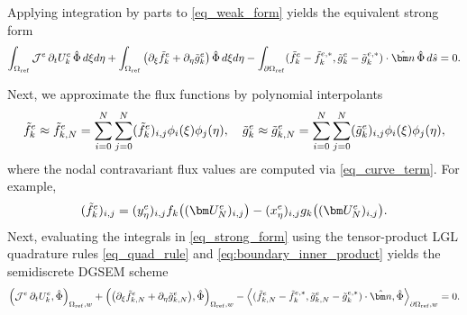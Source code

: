 \documentclass[fleqn,11pt]{amsart}
\newcommand{\omgr}{\Omega_{\mathrm{ref}}}
\newcommand{\domgr}{\partial\Omega_{\mathrm{ref}}}
\begin{document}
Applying integration by parts to \eqref{eq_weak_form} yields the equivalent
strong form
\begin{equation}
\int_{\Omega_{\mathrm{ref}}} \mathcal{J}^e\,\partial_tU_k^e\,\hat\Phi \,d\xi d\eta
+\int_{\Omega_{\mathrm{ref}}}\big(\partial_{\xi}\Tilde{f}_k^e+\partial_{\eta}\Tilde{g}_k^e\big)\,\hat\Phi \,d\xi d\eta
-\int_{\partial\Omega_{\mathrm{ref}}}(\Tilde{f}_k^e-\Tilde{f}_k^{e,*},\Tilde{g}_k^e-\Tilde{g}_k^{e,*})\cdot \hat{\bm n}\,\hat\Phi \,d\hat s=0.
\label{eq_strong_form}
\end{equation}

Next, we approximate the flux functions by polynomial interpolants
\begin{align}
 \Tilde f_{k}^e \approx  \Tilde f_{k,N}^e=\sum_{i=0}^N\sum_{j=0}^N
 (\Tilde f_{k}^e)_{i,j}\phi_i(\xi)\phi_j(\eta),\quad 
 \Tilde g_{k}^e \approx \Tilde g_{k,N}^e=\sum_{i=0}^N\sum_{j=0}^N
 (\Tilde g_{k}^e)_{i,j}\phi_i(\xi)\phi_j(\eta),
\end{align}
where the nodal contravariant flux values are computed via \eqref{eq_curve_term}. 
For example,
\[
(\Tilde f_{k}^e)_{i,j} = 
(y^{e}_{\eta})_{i,j}f_k\big((\bm U_N^e)_{i,j}\big)-
(x^{e}_{\eta})_{i,j}g_k\big((\bm U_N^e)_{i,j}\big).
\]
Next, evaluating the integrals in \eqref{eq_strong_form} using the tensor-product LGL quadrature rules \eqref{eq_quad_rule} and \eqref{eq:boundary_inner_product} yields the semidiscrete DGSEM scheme
\begin{equation}
\label{eq_dgsem}
\left(\mathcal{J}^e\,\partial_tU_k^e, \hat\Phi\right)_{\omgr,w}
+
\left(\big(\partial_{\xi}\Tilde{f}_{k,N}^e+\partial_{\eta}\Tilde{g}_{k,N}^e\big), \hat\Phi\right)_{\omgr,w}
-\left\langle(\Tilde{f}_{k,N}^e-\Tilde{f}_k^{e,*},\Tilde{g}_{k,N}^e-\Tilde{g}_k^{e,*})\cdot \hat{\bm n},\hat\Phi \right\rangle_{\domgr,w}=0.
\end{equation}
\end{document}
